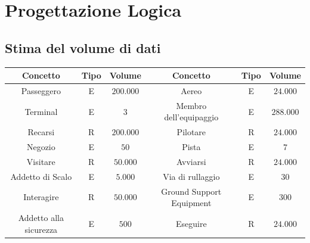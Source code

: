 
\newpage

\enlargethispage{1\linewidth}

\section{Progettazione Logica} 

\subsection{Stima del volume di dati}

\begin{tabular}{ | c  c  c | c  c  c | }
	\hline
	\rowcolor{airforceblue}
	\textbf{\color{white}Concetto} & \textbf{\color{white}Tipo} & \textbf{\color{white}Volume} & \textbf{\color{white}Concetto} & \textbf{\color{white}Tipo} & \textbf{\color{white}Volume}\\
	\hline
	\textsf{\small Passeggero} & \textsf{\small E} & \textsf{\small $ 200.000$} & \textsf{\small Aereo} & \textsf{\small E} & \textsf{\small $ 24.000 $}\\
	\hline
	\textsf{\small Terminal} & \textsf{\small E} & \textsf{\small $ 3 $} & \textsf{\small Membro dell'equipaggio} & \textsf{\small E} & \textsf{\small $ 288.000 $}\\
	\hline
	\textsf{\small Recarsi} & \textsf{\small R} & \textsf{\small $ 200.000 $} & \textsf{\small Pilotare} & \textsf{\small R} & \textsf{\small $ 24.000 $}\\
	\hline
	\textsf{\small Negozio} & \textsf{\small E} & \textsf{\small $ 50 $} & \textsf{\small Pista} & \textsf{\small E} & \textsf{\small $ 7 $}\\
	\hline
	\textsf{\small Visitare} & \textsf{\small R} & \textsf{\small $ 50.000 $} & \textsf{\small Avviarsi} & \textsf{\small R} & \textsf{\small $ 24.000 $}\\
	\hline
	\textsf{\small Addetto di Scalo} & \textsf{\small E} & \textsf{\small $ 5.000 $} & \textsf{\small Via di rullaggio} & \textsf{\small E} & \textsf{\small $ 30 $}\\
	\hline
	\textsf{\small Interagire} & \textsf{\small R} & \textsf{\small $ 50.000 $} & \textsf{\small Ground Support Equipment} & \textsf{\small E} & \textsf{\small $ 300$}\\
	\hline
	\textsf{\small Addetto alla sicurezza} & \textsf{\small E} & \textsf{\small $ 500 $} & \textsf{\small Eseguire} & \textsf{\small R} & \textsf{\small $ 24.000 $}\\

\end{tabular}

